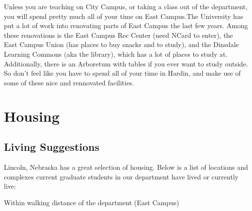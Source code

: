 \documentclass[
  12pt,
]{book}
\begin{document}
Unless you are teaching on City Campus, or taking a class out of the department, you will spend pretty much all of your time on East Campus.The University has put a lot of work into renovating parts of East Campus the last few years. Among these renovations is the East Campus Rec Center (need NCard to enter), the East Campus Union (has places to buy snacks and to study), and the Dinsdale Learning Commons (aka the library), which has a lot of places to study at. Additionally, there is an Arboretum with tables if you ever want to study outside. So don't feel like you have to spend all of your time in Hardin, and make use of some of these nice and rennovated facilities.

\hypertarget{housing}{%
\chapter{Housing}\label{housing}}

\hypertarget{living-suggestions}{%
\section{Living Suggestions}\label{living-suggestions}}

Lincoln, Nebraska has a great selection of housing. Below is a list of locations and complexes current graduate students in our department have lived or currently live:

Within walking distance of the department (East Campus)
\end{document}
